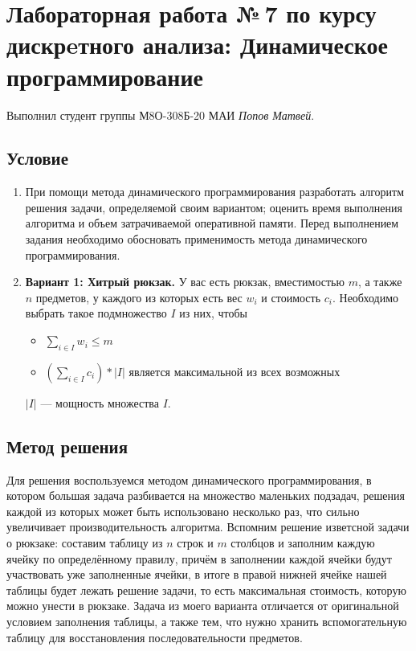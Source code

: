 \documentclass[12pt]{article}
\begin{document}
    \section*{Лабораторная работа №\,7 по курсу дискрeтного анализа: 
    Динамическое программирование}

    Выполнил студент группы М8О-308Б-20 МАИ \textit{Попов Матвей}.

    \subsection*{Условие}
 
    \begin{enumerate}
    \item При помощи метода динамического программирования разработать алгоритм 
    решения задачи, определяемой своим вариантом; оценить время выполнения 
    алгоритма и объем затрачиваемой оперативной памяти. Перед выполнением 
    задания необходимо обосновать применимость метода динамического 
    программирования.
    \item \textbf{Вариант 1: Хитрый рюкзак.} У вас есть рюкзак, вместимостью 
    $m$, а также $n$ предметов, у каждого из которых есть вес $w_i$ и 
    стоимость $c_i$. Необходимо выбрать такое подмножество $I$ из них, чтобы
    \begin{itemize}
        \item $\sum\limits_{i \in I} w_i \leq m$
        \item $(\sum\limits_{i \in I} c_i) \ast |I|$ является максимальной из всех 
        возможных
    \end{itemize}
    $|I|$ — мощность множества $I$.
    \end{enumerate}

    \subsection*{Метод решения}

    Для решения воспользуемся методом динамического программирования, в котором 
    большая задача разбивается на множество маленьких подзадач, решения каждой 
    из которых может быть использовано несколько раз, что сильно увеличивает 
    производительность алгоритма. Вспомним решение изветсной задачи о рюкзаке: 
    составим таблицу из $n$ строк и $m$ столбцов и заполним каждую ячейку по 
    определённому правилу, причём в заполнении каждой ячейки будут участвовать 
    уже заполненные ячейки, в итоге в правой нижней ячейке нашей таблицы будет 
    лежать решение задачи, то есть максимальная стоимость, которую можно унести 
    в рюкзаке. Задача из моего варианта отличается от оригинальной условием 
    заполнения таблицы, а также тем, что нужно хранить вспомогательную таблицу 
    для восстановления последовательности предметов.
\end{document}
